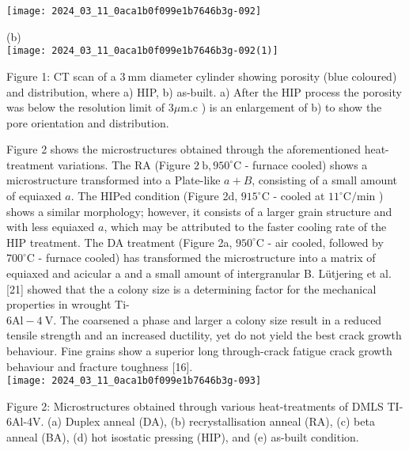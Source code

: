 \documentclass[10pt]{article}
\begin{document}
\begin{center}
\texttt{[image: 2024\_03\_11\_0aca1b0f099e1b7646b3g-092]}
\end{center}

(b)\\
\texttt{[image: 2024\_03\_11\_0aca1b0f099e1b7646b3g-092(1)]}

Figure 1: CT scan of a $3 \mathrm{~mm}$ diameter cylinder showing porosity (blue coloured) and distribution, where a) HIP, b) as-built. a) After the HIP process the porosity was below the resolution limit of $3 \mu \mathrm{m} . \mathrm{c}$ ) is an enlargement of b) to show the pore orientation and distribution.

Figure 2 shows the microstructures obtained through the aforementioned heat-treatment variations. The RA (Figure $2 \mathrm{~b}, 950^{\circ} \mathrm{C}$ - furnace cooled) shows a microstructure transformed into a Plate-like $a+B$, consisting of a small amount of equiaxed $a$. The HIPed condition (Figure 2d, $915^{\circ} \mathrm{C}$ - cooled at $11^{\circ} \mathrm{C} / \mathrm{min}$ ) shows a similar morphology; however, it consists of a larger grain structure and with less equiaxed $a$, which may be attributed to the faster cooling rate of the HIP treatment. The DA treatment (Figure 2a, $950^{\circ} \mathrm{C}$ - air cooled, followed by $700^{\circ} \mathrm{C}$ - furnace cooled) has transformed the microstructure into a matrix of equiaxed and acicular a and a small amount of intergranular B. Lütjering et al. [21] showed that the a colony size is a determining factor for the mechanical properties in wrought Ti-\\
$6 \mathrm{Al}-4 \mathrm{~V}$. The coarsened a phase and larger a colony size result in a reduced tensile strength and an increased ductility, yet do not yield the best crack growth behaviour. Fine grains show a superior long through-crack fatigue crack growth behaviour and fracture toughness [16].\\
\texttt{[image: 2024\_03\_11\_0aca1b0f099e1b7646b3g-093]}

Figure 2: Microstructures obtained through various heat-treatments of DMLS TI-6Al-4V. (a) Duplex anneal (DA), (b) recrystallisation anneal (RA), (c) beta anneal (BA), (d) hot isostatic pressing (HIP), and (e) as-built condition.
\end{document}
